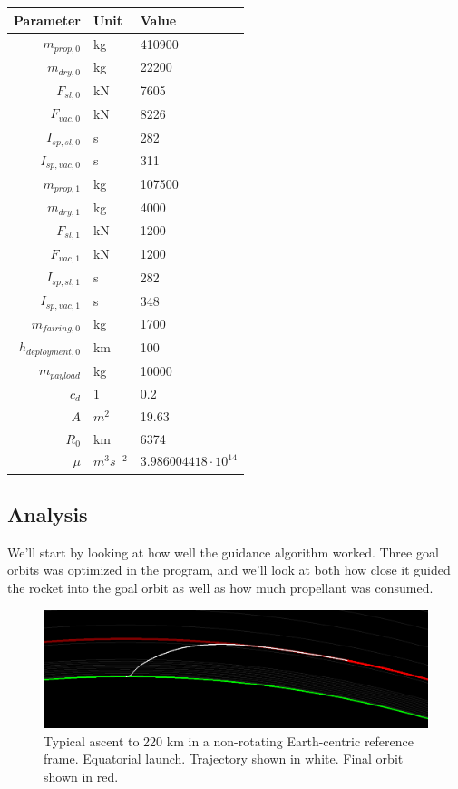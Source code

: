 \documentclass[11pt]{article}
\begin{document}
\begin{center}
\begin{tabular}{ r  | l | l  }
  Parameter & Unit & Value \\
  \hline
  $m_{prop,0}$ & kg & 410900 \\
  $m_{dry,0}$ & kg & 22200 \\
  $F_{sl,0}$ & kN & 7605 \\
  $F_{vac,0}$ & kN & 8226 \\
  $I_{sp,sl,0}$ & s & 282 \\
  $I_{sp,vac,0}$ & s & 311 \\
  \hline
  $m_{prop,1}$ & kg & 107500 \\
  $m_{dry,1}$ & kg & 4000 \\
  $F_{sl,1}$ & kN & 1200 \\
  $F_{vac,1}$ & kN & 1200 \\
  $I_{sp,sl,1}$ & s & 282 \\
  $I_{sp,vac,1}$ & s & 348 \\
  \hline
  $m_{fairing,0}$ & kg & 1700 \\
  $h_{deployment,0}$ & km & 100 \\
  \hline
  $m_{payload}$ & kg & 10000 \\
  \hline
  $c_d$ & 1 & 0.2 \\
  $A$ & $m^2$ & 19.63 \\
  \hline
  $R_0$ & km & 6374 \\
  $\mu$ & $m^3 s^{−2}$ & $3.986004418\cdot10^{14}$ \\
\end{tabular}
\end{center}

\subsection{Analysis}
We'll start by looking at how well the guidance algorithm worked. Three goal orbits was optimized in the program, and we'll look at both how close it guided the rocket into the goal orbit as well as how much propellant was consumed.

\begin{figure}[H]
  \centering
  \includegraphics[width=\textwidth]{./220km.png}
  \caption{
    \label{fig:trajectory}
    Typical ascent to 220 km in a non-rotating Earth-centric reference frame. Equatorial launch. Trajectory shown in white. Final orbit shown in red.}
\end{figure}
\end{document}
